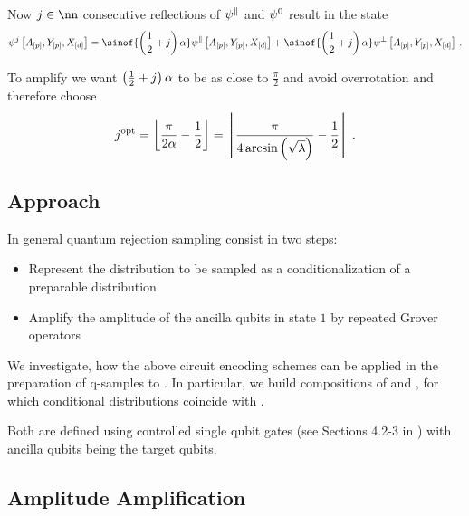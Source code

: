 Now $\repnum\in\nn$ consecutive reflections of $\psi^{\parallel}$ and $\psi^{0}$ result in the state
\begin{align*}
    \qstateofat{\repnum}{\avariables,\headvariables,\shortcatvariables}
    = \sinof{\left(\frac{1}{2}+\repnum\right)\rotanglesymbol} \qstateofat{\goodstatesymbol}{\avariables,\headvariables,\shortcatvariables}
    + \sinof{\left(\frac{1}{2}+\repnum\right)\rotanglesymbol} \qstateofat{\badstatesymbol}{\avariables,\headvariables,\shortcatvariables} \, .
\end{align*}

To amplify we want $\left(\frac{1}{2}+j\right)\alpha$ to be as close to $\frac{\pi}{2}$ and avoid overrotation and therefore choose
\begin{align*}
    j^{\mathrm{opt}}
    = \left\lfloor \frac{\pi}{2 \alpha} -\frac{1}{2}  \right\rfloor
    = \left\lfloor \frac{\pi}{4 \arcsin\left(\sqrt{\lambda}\right)} -\frac{1}{2}  \right\rfloor  \, .
\end{align*}


\subsection{Approach}

In general quantum rejection sampling consist in two steps:
\begin{itemize}
    \item Represent the distribution to be sampled as a conditionalization of a preparable distribution
    \item Amplify the amplitude of the ancilla qubits in state $1$ by repeated Grover operators
\end{itemize}

We investigate, how the above circuit encoding schemes can be applied in the preparation of q-samples to \ComputationActivationNetworks{}.
In particular, we build compositions of \computationCircuits{} and \activationCircuits{}, for which conditional distributions coincide with \ComputationActivationNetworks{}.

Both are defined using controlled single qubit gates (see Sections 4.2-3 in \cite{nielsen_quantum_2010}) with ancilla qubits being the target qubits.




\subsection{Amplitude Amplification}

